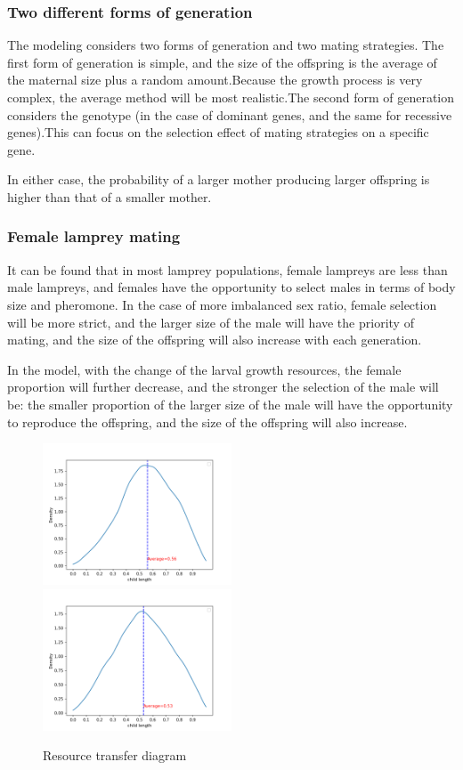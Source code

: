 \documentclass[12pt]{article}
\begin{document}
\subsubsection{Two different forms of generation}

The modeling considers two forms of generation and two mating strategies. The first form of
generation is simple, and the size of the offspring is the average of the maternal size
plus a random amount.Because the growth process is very complex, the average method will
be most realistic.The second form of generation considers the genotype (in the case of
dominant genes, and the same for recessive genes).This can focus on the selection effect
of mating strategies on a specific gene.

In either case, the probability of a larger mother producing larger offspring is higher
than that of a smaller mother.

\subsubsection{Female lamprey mating}
It can be found that in most lamprey populations, female lampreys are less than male lampreys,
and females have the opportunity to select males in terms of body size and pheromone. In the
case of more imbalanced sex ratio, female selection will be more strict, and the larger
size of the male will have the priority of mating, and the size of the offspring will
also increase with each generation.

In the model, with the change of the larval growth resources, the female proportion will
further decrease, and the stronger the selection of the male will be: the smaller proportion
of the larger size of the male will have the opportunity to reproduce the offspring, and the
size of the offspring will also increase.
\begin{figure}[ht]
	\centering
	\includegraphics[width=0.5\textwidth]{Q2_1.png}
	\includegraphics[width=0.5\textwidth]{Q2_2.png}

	\caption{Resource transfer diagram}
\end{figure}
\end{document}
